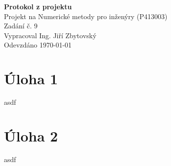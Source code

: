 \documentclass[a4paper,12pt]{article}
\begin{document}
\begin{center}
\LARGE\textbf{Protokol z projektu} \\
\vspace{2cm}
\large{
	Projekt na Numerické metody pro inženýry (P413003) \\
	Zadání č. 9 \\
	Vypracoval Ing. Jiří Zbytovský \\
	Odevzdáno \today
}
\end{center}

\newpage
\section*{Úloha 1}
asdf

\newpage
\section*{Úloha 2}
asdf
\end{document}

